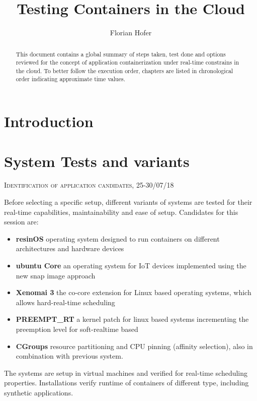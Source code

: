 \documentclass[]{scrartcl}
\title{Testing Containers in the Cloud}
\author{Florian Hofer}
\begin{document}
\maketitle

\begin{abstract}
	This document contains a global summary of steps taken, test done and options reviewed for the concept of application containerization under real-time constrains in the cloud. To better follow the execution order, chapters are listed in chronological order indicating approximate time values.
\end{abstract}

\section{Introduction}


\section{System Tests and variants}

{\small\textsc{Identification of application candidates, 25-30/07/18} \bigskip}

Before selecting a specific setup, different variants of systems are tested for their real-time capabilities, maintainability and ease of setup. Candidates for this session are:

\begin{itemize}
	\item \textbf{resinOS} operating system designed to run containers on different architectures and hardware devices
	\item \textbf{ubuntu Core} an operating system for IoT devices implemented using the new snap image approach
	\item \textbf{Xenomai 3} the co-core extension for Linux based operating systems, which allows hard-real-time scheduling
	\item \textbf{PREEMPT\_RT} a kernel patch for linux based systems incrementing the preemption level for soft-realtime based
	\item \textbf{CGroups} resource partitioning and CPU pinning (affinity selection), also in combination with previous system.
\end{itemize}

The systems are setup in virtual machines and verified for real-time scheduling properties. Installations verify runtime of containers of different type, including synthetic applications.
\end{document}
